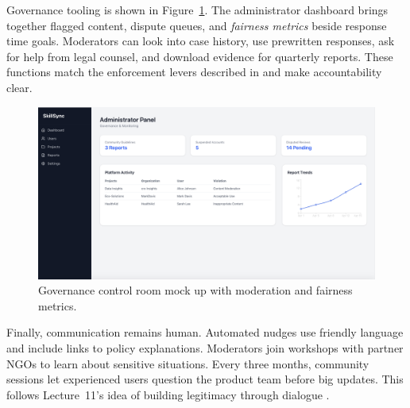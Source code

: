 Governance tooling is shown in Figure~\ref{fig:admin-panel}. The administrator dashboard brings together flagged content, dispute queues, and \textit{fairness metrics} beside response time goals. Moderators can look into case history, use prewritten responses, ask for help from legal counsel, and download evidence for quarterly reports. These functions match the enforcement levers described in \citet{Reillier2017} and make accountability clear.

\begin{figure}[H]
  \centering
  \includegraphics[width=0.85\linewidth]{figures/Organisation-Administratorpanel.png}
  \caption{Governance control room mock up with moderation and fairness metrics.}
  \label{fig:admin-panel}
\end{figure}

Finally, communication remains human. Automated nudges use friendly language and include links to policy explanations. Moderators join workshops with partner NGOs to learn about sensitive situations. Every three months, community sessions let experienced users question the product team before big updates. This follows Lecture~11’s idea of building legitimacy through dialogue \citep{Lecture11}.
